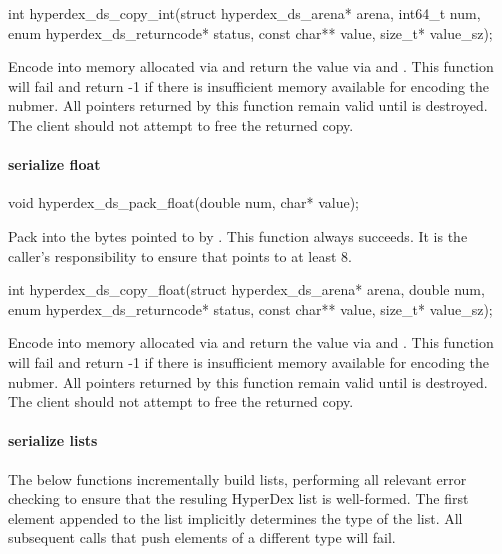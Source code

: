 \funcsep
\begin{ccode}
int hyperdex_ds_copy_int(struct hyperdex_ds_arena* arena, int64_t num,
                         enum hyperdex_ds_returncode* status,
                         const char** value, size_t* value_sz);
\end{ccode}
\funcdesc Encode  into memory allocated via  and return
the value via  and .  This function will fail and
return -1 if there is insufficient memory available for encoding the nubmer.
All pointers returned by this function remain valid until  is
destroyed.  The client should not attempt to free the returned copy.

\paragraph{serialize float}

\begin{ccode}
void hyperdex_ds_pack_float(double num, char* value);
\end{ccode}
\funcdesc Pack  into the bytes pointed to by .  This
function always succeeds.  It is the caller's responsibility to ensure that
 points to at least \unit{8}{\byte}.

\funcsep
\begin{ccode}
int hyperdex_ds_copy_float(struct hyperdex_ds_arena* arena, double num,
                           enum hyperdex_ds_returncode* status,
                           const char** value, size_t* value_sz);
\end{ccode}
\funcdesc Encode  into memory allocated via  and return
the value via  and .  This function will fail and
return -1 if there is insufficient memory available for encoding the nubmer.
All pointers returned by this function remain valid until  is
destroyed.  The client should not attempt to free the returned copy.

\paragraph{serialize lists}

The below functions incrementally build lists, performing all relevant error
checking to ensure that the resuling HyperDex list is well-formed.  The first
element appended to the list implicitly determines the type of the list.  All
subsequent calls that push elements of a different type will fail.

